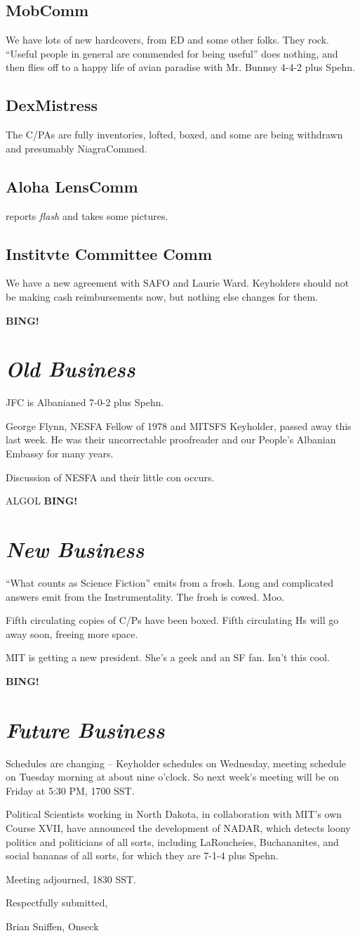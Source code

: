 \documentclass[10pt]{article}
\newcommand{\bing}{{\bf BING!} }
\newcommand{\goto}[1]{\bing \vskip 12pt \section*{{\em{#1}}}}
\newcommand{\ps}{ plus Spehn\xspace}
\begin{document}
\subsection*{MobComm}
We have lots of new hardcovers, from ED and some other folks.  They
rock.  ``Useful people in general are commended for being useful''
does nothing, and then flies off to a happy life of avian paradise
with Mr. Bunnsy 4-4-2\ps.

\subsection*{DexMistress}
The C/PAs are fully inventories, lofted, boxed, and some are being
withdrawn and presumably NiagraCommed.

\subsection*{Aloha LensComm}
reports \emph{flash} and takes some pictures.

\subsection*{Institvte Committee Comm}
We have a new agreement with SAFO and Laurie Ward.  Keyholders should
not be making cash reimbursements now, but nothing else changes for
them.

\goto{Old Business}

JFC is Albanianed 7-0-2\ps.  

George Flynn, NESFA Fellow of 1978 and MITSFS Keyholder, passed away
this last week.  He was their uncorrectable proofreader and our
People's Albanian Embassy for many years.

Discussion of NESFA and their little con occurs.

ALGOL
\goto{New Business}

``What counts as Science Fiction'' emits from a frosh.  Long and
complicated answers emit from the Instrumentality.  The frosh is
cowed.  Moo.

Fifth circulating copies of C/Ps have been boxed.  Fifth circulating
Hs will go away soon, freeing more space.

MIT is getting a new president.  She's a geek and an SF fan.  Isn't this cool.

\goto{Future Business}

Schedules are changing -- Keyholder schedules on Wednesday, meeting
schedule on Tuesday morning at about nine o'clock.  So next week's
meeting will be on Friday at 5:30 PM, 1700 SST.

Political Scientists working in North Dakota, in collaboration with
MIT's own Course XVII, have announced the development of NADAR, which
detects loony politics and politicians of all sorts, including
LaRoucheies, Buchananites, and social bananas of all sorts, for which
they are 7-1-4\ps.

\noindent
Meeting adjourned, 1830 SST.

\vspace{18pt}

\centerline{Respectfully submitted,}
\centerline{Brian Sniffen, Onseck}
\end{document}
